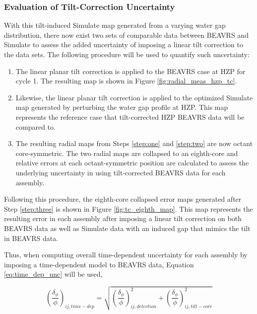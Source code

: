 \documentclass{article}
\begin{document}
\subsubsection{Evaluation of Tilt-Correction Uncertainty}\label{sec:tc_uq_eval}

With this tilt-induced Simulate map generated from a varying water gap distribution, there now exist two sets of comparable data between BEAVRS and Simulate to assess the added uncertainty of imposing a linear tilt correction to the data sets. The following procedure will be used to quantify such uncertainty:

\begin{enumerate}[label={(\arabic*)}]
\item\label{step:one} The linear planar tilt correction is applied to the BEAVRS case at HZP for cycle 1. The resulting map is shown in Figure \ref{fig:radial_meas_hzp_tc}.
\item\label{step:two} Likewise, the linear planar tilt correction is applied to the optimized Simulate map generated by perturbing the water gap profile at HZP. This map represents the reference case that tilt-corrected HZP BEAVRS data will be compared to.
\item\label{step:three} The resulting radial maps from Steps \ref{step:one} and \ref{step:two} are now octant core-symmetric. The two radial maps are collapsed to an eighth-core and relative errors at each octant-symmetric position are calculated to assess the underlying uncertainty in using tilt-corrected BEAVRS data for each assembly.
\end{enumerate}

Following this procedure, the eighth-core collapsed error maps generated after Step \ref{step:three} is shown in Figure \ref{fig:tc_eighth_map}. This map represents the resulting error in each assembly after imposing a linear tilt correction on both BEAVRS data as well as Simulate data with an induced gap that mimics the tilt in BEAVRS data.



Thus, when computing overall time-dependent uncertainty for each assembly by imposing a time-dependent model to BEAVRS data, Equation \ref{eq:time_dep_unc} will be used,

\begin{equation}
\label{eq:time_dep_unc}
  \left(\frac{\delta_\phi}{\phi} \right)_{ij,time-dep} = \sqrt{\left(\frac{\delta_\phi}{\phi} \right)_{ij,detection}^{2} + \left(\frac{\delta_\phi}{\phi} \right)_{ij,tilt-corr}^{2}}
\end{equation}
\end{document}
